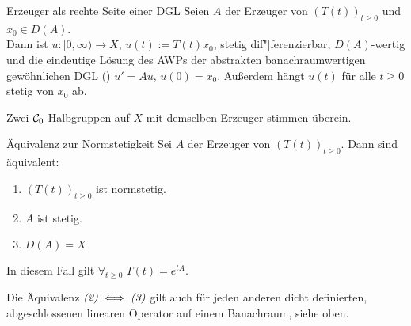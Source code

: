 \linie

\begin{Satz}{Erzeuger als rechte Seite einer DGL}
    Seien $A$ der Erzeuger von $(T(t))_{t \ge 0}$ und $x_0 \in D(A)$.\\
    Dann ist $u\colon [0, \infty) \rightarrow X$, $u(t) := T(t) x_0$,
    stetig dif"|ferenzierbar, $D(A)$-wertig und die eindeutige Lösung des AWPs der
    abstrakten banachraumwertigen gewöhnlichen DGL ()
    $u' = Au$, $u(0) = x_0$.
    Außerdem hängt $u(t)$ für alle $t \ge 0$ stetig von $x_0$ ab.
\end{Satz}

\begin{Kor}
    Zwei $\mathcal{C}_0$-Halbgruppen auf $X$ mit demselben Erzeuger stimmen überein.
\end{Kor}

\linie

\begin{Satz}{Äquivalenz zur Normstetigkeit}
    Sei $A$ der Erzeuger von $(T(t))_{t \ge 0}$.
    Dann sind äquivalent:
    \begin{enumerate}
        \item
        $(T(t))_{t \ge 0}$ ist normstetig.

        \item
        $A$ ist stetig.

        \item
        $D(A) = X$
    \end{enumerate}
    In diesem Fall gilt $\forall_{t \ge 0}\; T(t) = e^{tA}$.
\end{Satz}

\begin{Bem}
    Die Äquivalenz $\text{\emph{(2)}} \iff \text{\emph{(3)}}$ gilt auch für jeden anderen
    dicht definierten, abgeschlossenen linearen Operator auf einem Banachraum, siehe oben.
\end{Bem}

\pagebreak
